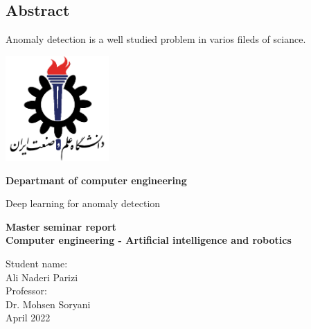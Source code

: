 \documentclass[12pt,a4paper]{report}
\theoremstyle{definition}
\theoremstyle{definition}
\begin{document}
\printindex
\newpage
\begin{latin}
\chapter*{Abstract}
Anomaly detection is a well studied problem in varios fileds of sciance.

\newpage
\thispagestyle{empty}

	\vspace*{25mm}
	\centerline{\includegraphics[height=4cm]{./images/logos/iust.png}}

	\begin{center}
	\textbf{
Departmant of computer engineering
	}
	\\[1cm]
	\baselineskip=2cm
	{\titr
	\begin{Huge}
	Deep learning for anomaly detection\\[1cm]
	\end{Huge}}
	{\Large 
		\textbf{
			Master seminar report \\
Computer engineering - Artificial intelligence and robotics
		} \\[1cm]
	}

	{\Large { Student name:}
	\\
	{\Large  Ali Naderi Parizi}
	\\[.5cm]
	{\Large  Professor:}
	\\
	{\Large Dr.  Mohsen Soryani}
	\\[.6cm]
	}
April 2022
	\end{center}

\end{latin}
\end{document}
